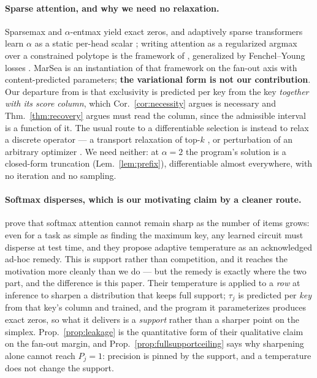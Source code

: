 \documentclass{article}
\begin{document}
\paragraph{Sparse attention, and why we need no relaxation.} Sparsemax
\citep{martins2016softmax} and $\alpha$-entmax \citep{peters2019sparse} yield exact zeros, and
adaptively sparse transformers learn $\alpha$ as a static per-head scalar
\citep{correia2019adaptively}; writing attention as a regularized argmax over a constrained
polytope is the framework of \citet{niculae2017regularized}, generalized by Fenchel--Young losses
\citep{blondel2019fenchel}. MarSea is an instantiation of that framework on the fan-out axis with
content-predicted parameters; \textbf{the variational form is not our contribution}. Our
departure from \citet{correia2019adaptively} is that exclusivity is predicted per key from the
key \emph{together with its score column}, which Cor.~\ref{cor:necessity} argues is necessary
and Thm.~\ref{thm:recovery} argues must read the column, since the admissible interval is a
function of it. The usual route to a differentiable selection is instead to relax a discrete
operator --- a transport relaxation of top-$k$ \citep{xie2020differentiable}, or perturbation of
an arbitrary optimizer \citep{berthet2020perturbed}. We need neither: at $\alpha=2$ the
program's solution is a closed-form truncation (Lem.~\ref{lem:prefix}), differentiable almost
everywhere, with no iteration and no sampling.

\paragraph{Softmax disperses, which is our motivating claim by a cleaner route.}
\citet{velickovic2024softmax} prove that softmax attention cannot remain sharp as the number of
items grows: even for a task as simple as finding the maximum key, any learned circuit must
disperse at test time, and they propose adaptive temperature as an acknowledged ad-hoc remedy.
This is support rather than competition, and it reaches the motivation more cleanly than we do
--- but the remedy is exactly where the two part, and the difference is this paper. Their
temperature is applied to a \emph{row} at inference to sharpen a distribution that keeps full
support; $\tau_j$ is predicted per \emph{key} from that key's column and trained, and the
program it parameterizes produces exact zeros, so what it delivers is a \emph{support} rather
than a sharper point on the simplex. Prop.~\ref{prop:leakage} is the quantitative form of their
qualitative claim on the fan-out margin, and Prop.~\ref{prop:fullsupportceiling} says why
sharpening alone cannot reach $P_j=1$: precision is pinned by the support, and a temperature does
not change the support.
\end{document}
